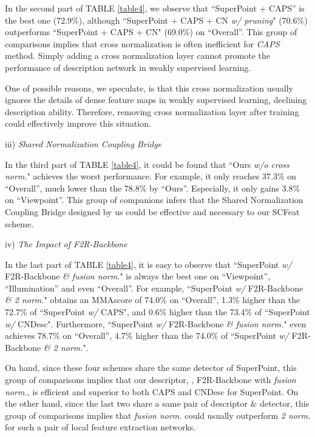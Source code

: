 \documentclass[journal]{IEEEtran}
\begin{document}
In the second part of
TABLE \ref{table4}, we observe that ``SuperPoint + CAPS'' is the best one (72.9\%), although 
``SuperPoint + CAPS + CN \textit{w/ pruning}" (70.6\%) outperforms ``SuperPoint + CAPS + CN" (69.0\%) on ``Overall''. This group of comparisons implies that cross normalization is often inefficient for \emph{CAPS} method. Simply adding a cross normalization layer cannot promote the performance of description network in weakly supervised learning.

One of possible reasons, we speculate, is that this cross normalization usually ignores the details of dense feature maps in weakly supervised learning, declining description ability. Therefore, removing cross normalization layer after training could effectively improve this situation. 


iii) \emph{Shared Normalization Coupling Bridge} 

In the third part of TABLE \ref{table4}, it could be found that ``Ours \textit{w/o cross norm.}" achieves the worst performance. For example, it only reaches 37.3\% on ``Overall'', much lower than the 78.8\% by ``Ours''. Especially, it only gains 3.8\% on ``Viewpoint''. This group of companions infers that the Shared Normalization Coupling Bridge designed by us could be effective and necessary to our SCFeat scheme. 



iv) \emph{The Impact of F2R-Backbone}

In the last part of TABLE \ref{table4}, it is easy to observe that ``SuperPoint \textit{w/} F2R-Backbone \textit{\& fusion norm.}" is always the best one on ``Viewpoint'', ``Illumination'' and even ``Overall''. 
For example, 
``SuperPoint \textit{w/} F2R-Backbone \textit{\& 2 norm.}" obtains an MMAscore of 74.0\% on ``Overall'', 1.3\% higher than the 72.7\% of ``SuperPoint \textit{w/} CAPS", and 0.6\% higher than the 73.4\% of ``SuperPoint \textit{w/} CNDesc".
Furthermore, ``SuperPoint \textit{w/} F2R-Backbone \textit{\& fusion norm.}" even achieves 78.7\% on ``Overall'', 4.7\% higher 
than the 74.0\% of ``SuperPoint \textit{w/} F2R-Backbone \textit{\& 2 norm.}".

On hand, since these four schemes share the same detector of SuperPoint, this group of comparisons implies that our descriptor, , F2R-Backbone with \textit{fusion norm.}, is efficient and superior to both CAPS and CNDesc for SuperPoint.
On the other hand, since the last two share a same pair of descriptor \& detector, this group of comparisons implies that \textit{fusion norm.} could usually outperform \textit{2 norm.} for such a pair of local feature extraction networks. 
\end{document}
